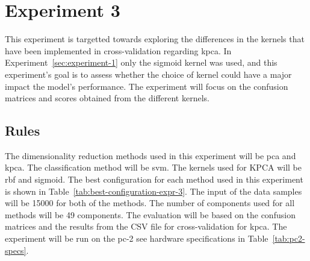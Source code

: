 \section{Experiment 3}\label{sec:experiment-3}
This experiment is targetted towards exploring the differences in the kernels that have been implemented in cross-validation regarding \gls{kpca}. In Experiment~\ref{sec:experiment-1} only the sigmoid kernel was used, and this experiment's goal is to assess whether the choice of kernel could have a major impact the model's performance. The experiment will focus on the confusion matrices and scores obtained from the different kernels. 




\subsection{Rules}
The dimensionality reduction methods used in this experiment will be \gls{pca} and \gls{kpca}. The classification method will be \gls{svm}. The kernels used for KPCA will be \gls{rbf} and sigmoid.
The best configuration for each method used in this experiment is shown in Table~\ref{tab:best-configuration-expr-3}. The input of the data samples will be 15000 for both of the methods. The number of components used for all methods will be 49 components. The evaluation will be based on the confusion matrices and the results from the CSV file for cross-validation for \gls{kpca}. The experiment will be run on the pc-2 see hardware specifications in Table~\ref{tab:pc2-specs}.

